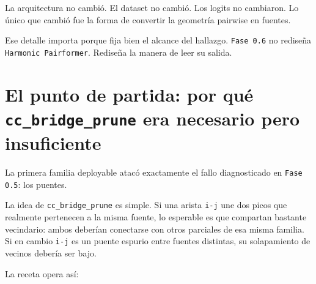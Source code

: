 \documentclass[11pt]{article}
\begin{document}
La arquitectura no cambió. El dataset no cambió. Los logits no cambiaron. Lo único que cambió fue la forma de convertir la geometría pairwise en fuentes.

Ese detalle importa porque fija bien el alcance del hallazgo. \texttt{Fase 0.6} no rediseña \texttt{Harmonic Pairformer}. Rediseña la manera de leer su salida.

\section{El punto de partida: por qué \texttt{cc\_bridge\_prune} era necesario pero insuficiente}

La primera familia deployable atacó exactamente el fallo diagnosticado en \texttt{Fase 0.5}: los puentes.

La idea de \texttt{cc\_bridge\_prune} es simple. Si una arista \texttt{i-j} une dos picos que realmente pertenecen a la misma fuente, lo esperable es que compartan bastante vecindario: ambos deberían conectarse con otros parciales de esa misma familia. Si en cambio \texttt{i-j} es un puente espurio entre fuentes distintas, su solapamiento de vecinos debería ser bajo.

La receta opera así:

\begin{figure}[H]
\centering
{}
\end{figure}
\end{document}
